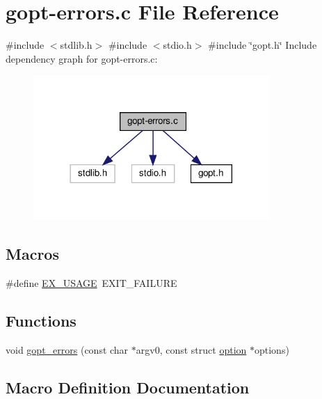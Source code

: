 \hypertarget{gopt-errors_8c}{}\section{gopt-\/errors.c File Reference}
\label{gopt-errors_8c}
{\ttfamily \#include $<$stdlib.\+h$>$}\newline
{\ttfamily \#include $<$stdio.\+h$>$}\newline
{\ttfamily \#include \char`\"{}gopt.\+h\char`\"{}}\newline
Include dependency graph for gopt-\/errors.c\+:\nopagebreak
\begin{figure}[H]
\begin{center}
\leavevmode
\includegraphics[width=254pt]{d4/d05/gopt-errors_8c__incl}
\end{center}
\end{figure}
\subsection*{Macros}
\begin{DoxyCompactItemize}
\item 
\#define \hyperlink{gopt-errors_8c_abbdf9290893d2876419c13b7b28f5d4e}{E\+X\+\_\+\+U\+S\+A\+GE}~E\+X\+I\+T\+\_\+\+F\+A\+I\+L\+U\+RE
\end{DoxyCompactItemize}
\subsection*{Functions}
\begin{DoxyCompactItemize}
\item 
void \hyperlink{gopt-errors_8c_a4e86a5003bf59357d83816f46e914e53}{gopt\+\_\+errors} (const char $\ast$argv0, const struct \hyperlink{structoption}{option} $\ast$options)
\end{DoxyCompactItemize}


\subsection{Macro Definition Documentation}
\mbox{\label{gopt-errors_8c_abbdf9290893d2876419c13b7b28f5d4e}} 

